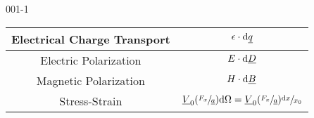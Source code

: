 \begin{mitframe}{001-1}
{\begin{tabular}{ | c | c |  }
	\hline  
            
	Electrical Charge Transport & $\elecpot \cdot \mathrm{d}\eleccharge$ \\
            
	\hline  
    
            
	Electric Polarization & $\elecfield \cdot \mathrm{d}\uline{\elecdisplace}$ \\
            
	\hline
            
	Magnetic Polarization & $\magfield \cdot \mathrm{d}\magind$ \\ \hline
            
	Stress-Strain & $\origvol(\sfrac{\force_{\disp}}{\totalsa})\mathrm{d}\linstrain = \origvol(\sfrac{\force_{\disp}}{\totalsa})\sfrac{\mathrm{d}\disp}{\disp_{\init}} $ \\ 
%
%
    \hline  
    
    
            
\end{tabular}

}
\end{mitframe}